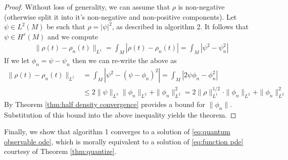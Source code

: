 \documentclass[12pt]{amsart}
\begin{document}
\begin{proof}
	Without loss of generality, we can assume that $\rho$ is non-negative (otherwise split it into it's non-negative and non-positive components).
	Let $\psi \in L^{2}(M)$ be such that $\rho = | \psi |^{2}$, as described in algorithm 2.
	It follows that $\psi \in H^{s}(M)$ and we compute
	\begin{align*}
		\| \rho(t) - \rho_{n}(t) \|_{L^{1}} = \int_{M} | \rho(t) - \rho_{n}(t)| = \int_{M} | \psi^{2} - \psi_{n}^{2} |
	\end{align*}
	If we let $\phi_{n} = \psi - \psi_{n}$ then we can re-write the above as
	\begin{align*}
		\| \rho(t) - \rho_{n}(t) \|_{L^{1}}  &= \int_{M} | \psi^{2} - (\psi - \phi_{n})^{2} | = \int_{M} | 2 \psi \phi_{n} - \phi_{n}^{2} | \\
			&\leq 2 \| \psi \|_{L^{2}} \| \phi_{n}\|_{L^{2}} + \| \phi_{n} \|_{L^{2}}^{2} = 2 \| \rho \|_{L^{1}}^{1/2} \cdot \| \phi_{n} \|_{L^{2}} + \| \phi_{n} \|_{L^{2}}^{2}
	\end{align*}
	By Theorem \ref{thm:half density convergence} provides a bound for $\| \phi_{n} \|$.
	Substitution of this bound into the above inequality yields the theorem.
\end{proof}

Finally, we show that algorithm 1 converges to a solution of \eqref{eq:quantum observable ode}, which is morally equivalent to a solution
of \eqref{eq:function pde} courtesy of Theorem \ref{thm:quantize}.
\end{document}
